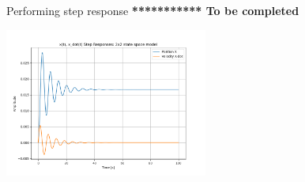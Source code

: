 \begin{ExampleSmall}
Performing step response
{\bf ************  To be completed}


\includegraphics[width=0.5\textwidth]{figs08/B14H54.png}
\end{ExampleSmall}




